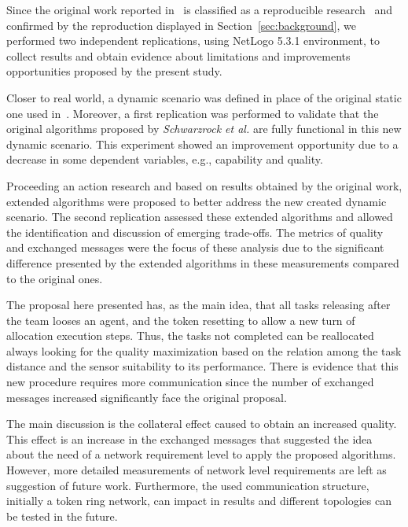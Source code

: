 Since the original work reported in~\citep{MAS07} is classified as a reproducible research~\citep{exp02} and confirmed by the reproduction displayed in Section~\ref{sec:background}, we performed two independent replications, using NetLogo 5.3.1 environment, to collect results and obtain evidence about limitations and improvements opportunities proposed by the present study.

Closer to real world, a dynamic scenario was defined in place of the original static one used in~\citep{MAS07}. Moreover, a first replication was performed to validate that the original algorithms proposed by \textit{Schwarzrock et al.} are fully functional in this new dynamic scenario. This experiment showed an improvement opportunity due to a decrease in some dependent variables, e.g., capability and quality. 

Proceeding an action research and based on results obtained by the original work, extended algorithms were proposed to better address the new created dynamic scenario. The second replication assessed these extended algorithms and allowed the identification and discussion of emerging trade-offs. The metrics of quality and exchanged messages were the focus of these analysis due to the significant difference presented by the extended algorithms in these measurements compared to the original ones.

The proposal here presented has, as the main idea, that all tasks releasing after the team looses an agent, and the token resetting to allow a new turn of allocation execution steps. Thus, the tasks not completed can be reallocated always looking for the quality maximization based on the relation among the task distance and the sensor suitability to its performance. There is evidence that this new procedure requires more communication since the number of exchanged messages increased significantly face the original proposal.

The main discussion is the collateral effect caused to obtain an increased quality. This effect is an increase in the exchanged messages that suggested the idea about the need of a network requirement level to apply the proposed algorithms. However, more detailed measurements of network level requirements are left as suggestion of future work. Furthermore, the used communication structure, initially a token ring network, can impact in results and different topologies can be tested in the future.